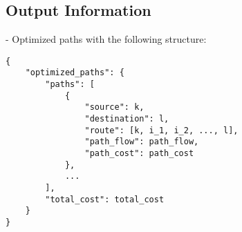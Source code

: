 \documentclass{article}
\begin{document}
\subsection*{Output Information}
- Optimized paths with the following structure:
\begin{verbatim}
{
    "optimized_paths": {
        "paths": [
            {
                "source": k,
                "destination": l,
                "route": [k, i_1, i_2, ..., l],
                "path_flow": path_flow,
                "path_cost": path_cost
            },
            ...
        ],
        "total_cost": total_cost
    }
}
\end{verbatim}
\end{document}
